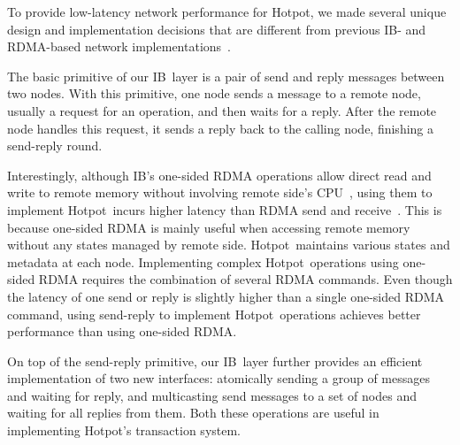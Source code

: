 \documentclass[sigconf]{acmart}
\newcommand{\hotpot}{Hotpot}
\newcommand{\on}{ON}
\newcommand{\dn}{DN}
\newcommand{\ib}{IB}
\begin{document}
{ 
To provide low-latency network performance for \hotpot, 
we made several unique design and implementation decisions that are different from previous 
\ib- and RDMA-based network implementations~\cite{Dragojevic14-NSDI,Nelson15-ATC,Kalia14-SIGCOMM}.


The basic primitive of our \ib\ layer is a pair of send and reply messages
between two nodes. 
With this primitive, one node sends a message to a remote node,
usually a request for an operation, and then waits for a reply.
After the remote node handles this request, it sends a reply back to the calling node,
finishing a send-reply round. 

Interestingly, although \ib's one-sided RDMA operations allow direct read and write to remote memory 
without involving remote side's CPU~\cite{Dragojevic14-NSDI}, 
using them to implement \hotpot\ incurs higher latency than RDMA send and receive~\cite{Kalia14-SIGCOMM}.
This is because one-sided RDMA is mainly useful when accessing remote memory without any states managed by remote side.
\hotpot\ maintains various states and metadata at each node. 
Implementing complex \hotpot\ operations using one-sided RDMA requires the combination of several RDMA commands.
Even though the latency of one send or reply is slightly higher than a single one-sided RDMA command,
using send-reply to implement \hotpot\ operations achieves better performance than using one-sided RDMA.

On top of the send-reply primitive, our \ib\ layer further provides an efficient implementation of 
two new interfaces:
atomically sending a group of messages and waiting for reply, 
and multicasting send messages to a set of nodes and waiting for all replies from them.
Both these operations are useful in implementing \hotpot's transaction system.

}
\end{document}
